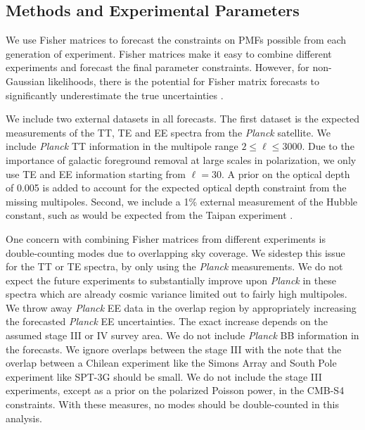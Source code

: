 \documentclass[preprint]{emulateapj}
\newcommand{\planck}{{\sl Planck}}
\begin{document}
\subsection{Methods and Experimental Parameters}

We use Fisher matrices to forecast the constraints on PMFs possible from each generation of experiment. 
Fisher matrices make it easy to combine different experiments and forecast the final parameter constraints. 
However, for non-Gaussian likelihoods, there is the potential for Fisher matrix forecasts to significantly underestimate the true uncertainties \citep[see e.g.,][]{wolz12}. 


We include two external datasets in all forecasts. 
The first dataset is the expected measurements of the  TT, TE and EE spectra from the \planck{} satellite. 
We include \planck{} TT information in the multipole range $2\le \ell \le 3000$. 
Due to the importance of galactic foreground removal at large scales in polarization, we only use TE and EE information starting from $\ell = 30$. 
A prior on the optical depth of 0.005 is added to account for the expected optical depth constraint from the missing multipoles. 
Second, we include a 1\% external measurement of the Hubble constant, such as would be expected from the Taipan experiment \citep{kuehn14}. 

One concern with combining Fisher matrices from different experiments is double-counting modes due to overlapping sky coverage. 
We sidestep this issue for the TT or TE spectra, by only using the \planck{} measurements. 
We do not expect the future experiments to substantially improve upon \planck{} in these spectra which are already cosmic variance limited out to fairly high multipoles. 
We throw away \planck{} EE data in the overlap region by appropriately increasing the forecasted \planck{} EE uncertainties. 
The exact increase depends on the assumed stage III or IV survey area.
We do not include \planck{} BB information in the forecasts. 
We ignore overlaps between the stage III  with the note that the overlap between a Chilean experiment like the Simons Array and South Pole experiment like SPT-3G should be small.
We do not include the stage III experiments, except as a prior on the polarized Poisson power, in the CMB-S4 constraints. 
With these measures, no modes should be double-counted in this analysis. 
\end{document}
